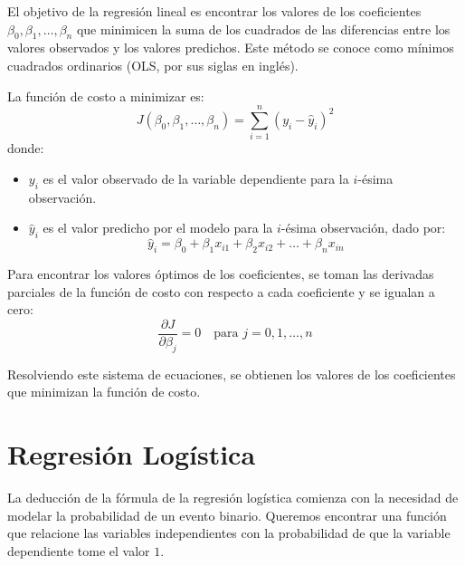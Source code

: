 
El objetivo de la regresión lineal es encontrar los valores de los coeficientes $\beta_0, \beta_1, \ldots, \beta_n$ que minimicen la suma de los cuadrados de las diferencias entre los valores observados y los valores predichos. Este método se conoce como mínimos cuadrados ordinarios (OLS, por sus siglas en inglés).

La función de costo a minimizar es:
\begin{equation}
J\left(\beta_0, \beta_1, \ldots, \beta_n\right) = \sum_{i=1}^{n}\left(y_i - \hat{y}_i\right)^2
\end{equation}
donde:
\begin{itemize}
    \item $y_i$ es el valor observado de la variable dependiente para la $i$-ésima observación.
    \item $\hat{y}_i$ es el valor predicho por el modelo para la $i$-ésima observación, dado por:
    \begin{equation}
    \hat{y}_i = \beta_0 + \beta_1 x_{i1} + \beta_2 x_{i2} + \ldots + \beta_n x_{in}
    \end{equation}
\end{itemize}

Para encontrar los valores óptimos de los coeficientes, se toman las derivadas parciales de la función de costo con respecto a cada coeficiente y se igualan a cero:
\begin{equation}
\frac{\partial J}{\partial \beta_j} = 0 \quad \text{para } j = 0, 1, \ldots, n
\end{equation}

Resolviendo este sistema de ecuaciones, se obtienen los valores de los coeficientes que minimizan la función de costo.

\section{Regresión Logística}

La deducción de la fórmula de la regresión logística comienza con la necesidad de modelar la probabilidad de un evento binario. Queremos encontrar una función que relacione las variables independientes con la probabilidad de que la variable dependiente tome el valor $1$.


